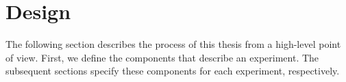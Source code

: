 \chapter{Design}
\label{ch:design}

The following section describes the process of this thesis from a high-level point of view. First, we define the components that describe an experiment. The subsequent sections specify these components for each experiment, respectively.


